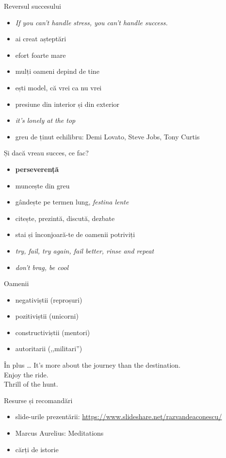 \documentclass[handout]{beamer}
\begin{document}
\begin{frame}{Reversul succesului}
  \begin{itemize}
    \pause \item \textit{If you can't handle stress, you can't handle success.}
    \pause \item ai creat așteptări
    \pause \item efort foarte mare
    \pause \item mulți oameni depind de tine
    \pause \item ești model, că vrei ca nu vrei
    \pause \item presiune din interior și din exterior
    \pause \item \textit{it's lonely at the top}
    \pause \item greu de ținut echilibru: Demi Lovato, Steve Jobs, Tony Curtis
  \end{itemize}
\end{frame}

\begin{frame}{Și dacă vreau succes, ce fac?}
  \begin{itemize}
    \pause \item \textbf{perseverență}
    \pause \item muncește din greu
    \pause \item gândește pe termen lung, \textit{festina lente}
    \pause \item citește, prezintă, discută, dezbate
    \pause \item stai și înconjoară-te de oamenii potriviți
    \pause \item \textit{try, fail, try again, fail better, rinse and repeat}
    \pause \item \textit{don't brag, be cool}
  \end{itemize}
\end{frame}

\begin{frame}{Oamenii}
  \begin{itemize}
    \pause \item negativiștii (reproșuri)
    \pause \item pozitiviștii (unicorni)
    \pause \item constructiviștii (mentori)
    \pause \item autoritarii (,,militari'')
  \end{itemize}
\end{frame}

\begin{frame}{În plus \ldots}
  \pause \Large{It's more about the journey than the destination.} \\
  \pause \Large{Enjoy the ride.} \\
  \pause \Large{Thrill of the hunt.} \\
\end{frame}

\begin{frame}{Resurse și recomandări}
  \begin{itemize}
    \item slide-urile prezentării: \url{https://www.slideshare.net/razvandeaconescu/}
    \item Marcus Aurelius: Meditations
    \item cărți de istorie
  \end{itemize}
\end{frame}
\end{document}
